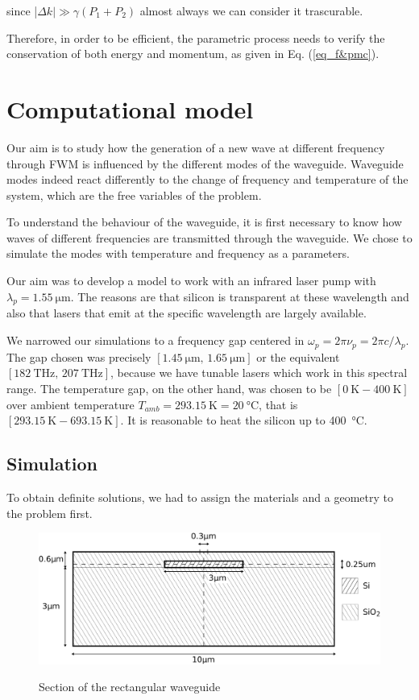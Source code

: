 \documentclass[12pt,a4paper,twoside]{article}
\begin{document}
since |$\Delta k| \gg \gamma(P_1 + P_2)$ almost always we can consider it trascurable.

Therefore, in order to be efficient, the parametric process needs to verify the conservation of both energy and momentum, as given in Eq. (\ref{eq_f&pmc}).

\section{Computational model}

Our aim is to study how the generation of a new wave at different frequency through FWM is influenced by the different modes of the waveguide.
Waveguide modes indeed react differently to the change of frequency and temperature of the system, which are the free variables of the problem.

To understand the behaviour of the waveguide, it is first necessary to know how waves of different frequencies are transmitted through the waveguide.
We chose to simulate the modes with temperature and frequency as a parameters.

Our aim was to develop a model to work with an infrared laser pump with $\lambda_{p} = \SI{1.55}{\um}$.
The reasons are that silicon is transparent at these wavelength and also that lasers that emit at the specific wavelength are largely available.

We narrowed our simulations to a frequency gap centered in $\omega_p = 2\pi \nu_p = 2\pi c / \lambda_{p}$.
The gap chosen was precisely $[\SI{1.45}{\um} ,\, \SI{1.65}{\um}]$ or the equivalent $[\SI{182}{\THz} ,\, \SI{207}{\THz}]$, because we have tunable lasers which work in this spectral range.
The temperature gap, on the other hand, was chosen to be $[\SI{0}{\K} - \SI{400}{\K}]$ over ambient temperature $T_{amb} = \SI{293.15}{\K} = \SI{20}{\celsius}$, that is $[\SI{293.15}{\K} - \SI{693.15}{\K}]$. It is reasonable to heat the silicon up to \SI{400}{\celsius}.

\subsection{Simulation}
To obtain definite solutions, we had to assign the materials and a geometry to the problem first.

\begin{figure}[ht]
	\centering
	\includegraphics[width=1\textwidth]{geometry.pdf}
	\label{fig_wg_Section}
	\caption{Section of the rectangular waveguide}
\end{figure}
\end{document}
